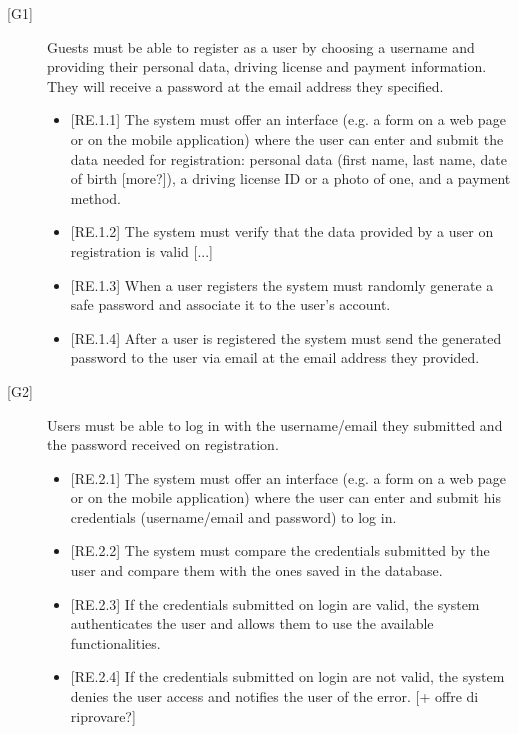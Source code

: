 \documentclass[english]{article}
\begin{document}
\begin{description}

\item[{[G1]}]{Guests must be able to register as a user by choosing a username and providing their personal data, driving license and payment information. They will receive a password at the email address they specified.
	
\begin{itemize}
\item{[RE.1.1] The system must offer an interface (e.g. a form on a web page or on the mobile application) where the user can enter and submit the data needed for registration: personal data (first name, last name, date of birth [more?]), a driving license ID or a photo of one, and a payment method.}
\item{[RE.1.2] The system must verify that the data provided by a user on registration is valid [...]}
\item{[RE.1.3] When a user registers the system must randomly generate a safe password and associate it to the user’s account.}
\item{[RE.1.4] After a user is registered the system must send the generated password to the user via email at the email address they provided.}
\end{itemize}
}

\item[{[G2]}]{Users must be able to log in with the username/email they submitted and the password received on registration.
\begin{itemize}
	\item{[RE.2.1] The system must offer an interface (e.g. a form on a web page or on the mobile application) where the user can enter and submit his credentials (username/email and password) to log in.}
	\item{[RE.2.2] The system must compare the credentials submitted by the user and compare them with the ones saved in the database.}
	\item{[RE.2.3] If the credentials submitted on login are valid, the system authenticates the user and allows them to use the available functionalities.}
	\item{[RE.2.4] If the credentials submitted on login are not valid, the system denies the user access and notifies the user of the error.}
[+ offre di riprovare?]
\end{itemize}
}


\end{description}
\end{document}
